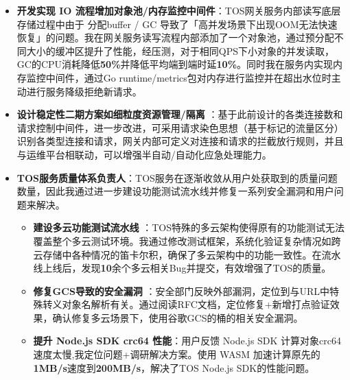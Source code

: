 \documentclass{resume}
\begin{document}
{\begin{itemize}[parsep=0.5ex]
\begin{itemize}[parsep=0.5ex]
    \item \textbf {开发实现 IO 流程增加对象池/内存监控中间件}：TOS网关服务内部读写底层存储过程中由于 分配buffer / GC 导致了「高并发场景下出现OOM无法快速恢复」的问题。我在网关服务读写流程内部添加了一个对象池，通过预分配不同大小的缓冲区提升了性能，经压测，对于相同QPS下小对象的并发读取，GC的CPU消耗降低\textbf{50\%}并降低平均端到端时延\textbf{10\%}。同时我在服务内实现内存监控中间件，通过Go runtime/metrics包对内存进行监控并在超出水位时主动进行服务降级拒绝新请求。
    
    
    \item \textbf {设计稳定性二期方案如细粒度资源管理/隔离} ：基于此前设计的各类连接数和请求控制中间件，进一步改进，可采用请求染色思想（基于标记的流量区分）识别各类型连接和请求，网关内部可定义对连接和请求的拦截放行规则，并且与运维平台相联动，可以增强半自动/自动化应急处理能力。
    \end{itemize}
  \end{itemize}
   
  \begin{itemize}[parsep=0.5ex]
    \item \textbf{TOS服务质量体系负责人}：TOS服务在逐渐收敛从用户处获取到的质量问题数量，因此我通过进一步建设功能测试流水线并修复一系列安全漏洞和用户问题来解决。
    
    \begin{itemize}[parsep=0.5ex]
        \item \textbf {建设多云功能测试流水线} ：TOS特殊的多云架构使得原有的功能测试无法覆盖整个多云测试环境。我通过修改测试框架，系统化验证复杂情况如跨云存储中各种情况的笛卡尔积，确保了多云架构中的功能一致性。在流水线上线后，发现\textbf{10}余个多云相关Bug并提交，有效增强了TOS的质量。
        
        \item \textbf {修复GCS导致的安全漏洞} ：安全部门反映外部漏洞，定位到与URL中特殊转义对象名解析有关。通过阅读RFC文档，定位修复+新增打点验证效果，确认修复多云场景下，使用谷歌GCS的桶的相关安全漏洞。
    
        \item \textbf {提升 Node.js SDK crc64 性能}：用户反馈 Node.js SDK 计算对象crc64速度太慢,我定位问题+调研解决方案。使用 WASM 加速计算原先的\textbf{1MB/s}速度到\textbf{200MB/s}，解决了TOS Node.js SDK的性能问题。


\end{itemize}
\end{itemize}}
\end{document}
